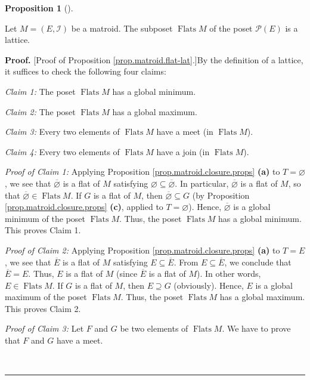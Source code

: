 \documentclass[numbers=enddot,12pt,final,onecolumn,notitlepage]{scrartcl}%
\theoremstyle{definition}
\newtheorem{prop}[theo]{Proposition}
\newenvironment{proposition}[1][]
{\begin{prop}[#1]\begin{leftbar}}
{\end{leftbar}\end{prop}}
\newenvironment{proof}[1][Proof]{\noindent\textbf{#1.} }{\ \rule{0.5em}{0.5em}}
\begin{document}
\begin{proposition}
\label{prop.matroid.flat-lat}Let $M=\left(  E,\mathcal{I}\right)  $ be a
matroid. The subposet $\operatorname*{Flats}M$ of the poset $\mathcal{P}%
\left(  E\right)  $ is a lattice.
\end{proposition}

\begin{proof}
[Proof of Proposition \ref{prop.matroid.flat-lat}.]By the definition of a
lattice, it suffices to check the following four claims:

\textit{Claim 1:} The poset $\operatorname*{Flats}M$ has a global minimum.

\textit{Claim 2:} The poset $\operatorname*{Flats}M$ has a global maximum.

\textit{Claim 3:} Every two elements of $\operatorname*{Flats}M$ have a meet
(in $\operatorname*{Flats}M$).

\textit{Claim 4:} Every two elements of $\operatorname*{Flats}M$ have a join
(in $\operatorname*{Flats}M$).

\textit{Proof of Claim 1:} Applying Proposition
\ref{prop.matroid.closure.props} \textbf{(a)} to $T=\varnothing$, we see that
$\overline{\varnothing}$ is a flat of $M$ satisfying $\varnothing
\subseteq\overline{\varnothing}$. In particular, $\overline{\varnothing}$ is a
flat of $M$, so that $\overline{\varnothing}\in\operatorname*{Flats}M$. If $G$
is a flat of $M$, then $\overline{\varnothing}\subseteq G$ (by Proposition
\ref{prop.matroid.closure.props} \textbf{(c)}, applied to $T=\varnothing$).
Hence, $\overline{\varnothing}$ is a global minimum of the poset
$\operatorname*{Flats}M$. Thus, the poset $\operatorname*{Flats}M$ has a
global minimum. This proves Claim 1.

\textit{Proof of Claim 2:} Applying Proposition
\ref{prop.matroid.closure.props} \textbf{(a)} to $T=E$, we see that
$\overline{E}$ is a flat of $M$ satisfying $E\subseteq\overline{E}$. From
$E\subseteq\overline{E}$, we conclude that $\overline{E}=E$. Thus, $E$ is a
flat of $M$ (since $\overline{E}$ is a flat of $M$). In other words,
$E\in\operatorname*{Flats}M$. If $G$ is a flat of $M$, then $E\supseteq G$
(obviously). Hence, $E$ is a global maximum of the poset
$\operatorname*{Flats}M$. Thus, the poset $\operatorname*{Flats}M$ has a
global maximum. This proves Claim 2.

\textit{Proof of Claim 3:} Let $F$ and $G$ be two elements of
$\operatorname*{Flats}M$. We have to prove that $F$ and $G$ have a meet.


\end{proof}
\end{document}
